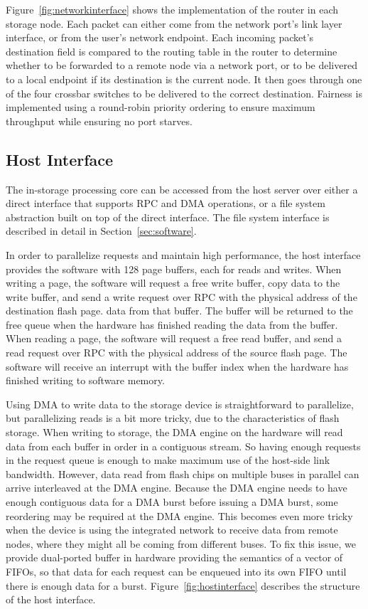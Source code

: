 Figure~\ref{fig:networkinterface} shows the implementation of the router in each
storage node. Each packet can either come from the network port's link layer
interface, or from the user's network endpoint. Each incoming packet's
destination field is compared to the routing table in the router to determine
whether to be forwarded to a remote node via a network port, or to be delivered
to a local endpoint if its destination is the current node. It then goes through
one of the four crossbar switches to be delivered to the correct destination. 
Fairness is implemented using a round-robin priority ordering to ensure maximum
throughput while ensuring no port starves.

\subsection{Host Interface}

The in-storage processing core can be accessed from the host server over either
a direct interface that supports RPC and DMA operations, or a file system
abstraction built on top of the direct interface. The file system interface is
described in detail in Section~\ref{sec:software}.

In order to parallelize requests and maintain high performance, the host
interface provides the software with 128 page buffers, each for reads and
writes. When writing a page, the software will request a free write buffer, copy
data to the write buffer, and send a write request over RPC with the
physical address of the destination flash page.
data from that buffer. The buffer will be returned to the free queue when the
hardware has finished reading the data from the buffer. When reading a page, the
software will request a free read buffer, and send a read request over RPC with
the physical address of the source flash page. The software will receive an
interrupt with the buffer index when the hardware has finished writing to
software memory.

Using DMA to write data to the storage device is straightforward to parallelize,
but parallelizing reads is a bit more tricky, due to the characteristics of flash
storage. When writing to storage, the DMA engine on the hardware will read data
from each buffer in order in a contiguous stream. So having enough requests in
the request queue is enough to make maximum use of the host-side link bandwidth.
However, data read from flash chips on multiple buses in parallel can arrive
interleaved at the DMA engine. Because the DMA engine needs to have enough
contiguous data for a DMA burst before issuing a DMA burst, some reordering may
be required at the DMA engine. This becomes even more tricky when the device is
using the integrated network to receive data from remote nodes, where they might
all be coming from different buses. To fix this issue, we provide dual-ported
buffer in hardware providing the semantics of a vector of FIFOs, so that data
for each request can be enqueued into its own FIFO until there is enough data
for a burst.
Figure~\ref{fig:hostinterface} describes the structure of the host
interface.

